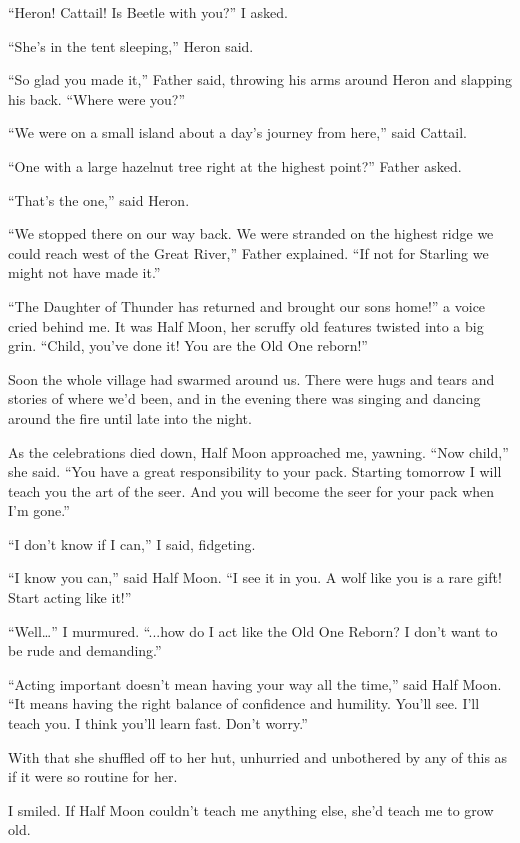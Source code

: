 ``Heron! Cattail! Is Beetle with you?'' I asked.

``She's in the tent sleeping,'' Heron said.

``So glad you made it,'' Father said, throwing his arms around Heron and slapping his back. ``Where were you?''

``We were on a small island about a day's journey from here,'' said Cattail.

``One with a large hazelnut tree right at the highest point?'' Father asked.

``That's the one,'' said Heron.

``We stopped there on our way back. We were stranded on the highest ridge we could reach west of the Great River,'' Father explained. ``If not for Starling we might not have made it.''

``The Daughter of Thunder has returned and brought our sons home!'' a voice cried behind me. It was Half Moon, her scruffy old features twisted into a big grin. ``Child, you've done it! You are the Old One reborn!''

Soon the whole village had swarmed around us. There were hugs and tears and stories of where we'd been, and in the evening there was singing and dancing around the fire until late into the night.

As the celebrations died down, Half Moon approached me, yawning. ``Now child,'' she said. ``You have a great responsibility to your pack. Starting tomorrow I will teach you the art of the seer. And you will become the seer for your pack when I'm gone.''

``I don't know if I can,'' I said, fidgeting.

``I know you can,'' said Half Moon. ``I see it in you. A wolf like you is a rare gift! Start acting like it!''

``Well\ldots'' I murmured. ``...how do I act like the Old One Reborn? I don't want to be rude and demanding.''

``Acting important doesn't mean having your way all the time,'' said Half Moon. ``It means having the right balance of confidence and humility. You'll see. I'll teach you. I think you'll learn fast. Don't worry.''

With that she shuffled off to her hut, unhurried and unbothered by any of this as if it were so routine for her.

I smiled. If Half Moon couldn't teach me anything else, she'd teach me to grow old.

\secdiv

